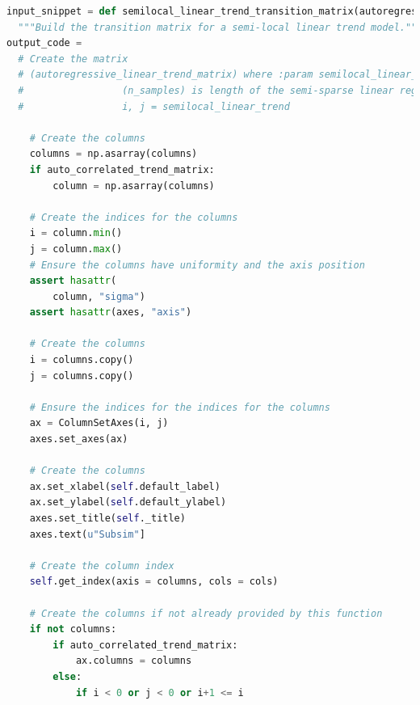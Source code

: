 \documentclass[10pt,twocolumn]{article}
\begin{document}
\begin{lstlisting}[language=Python,caption=Sample generated using small (117M) GPT-2 model after 40000 iterations.]
input_snippet = def semilocal_linear_trend_transition_matrix(autoregressive_coef):
  """Build the transition matrix for a semi-local linear trend model.""",
output_code = 
  # Create the matrix
  # (autoregressive_linear_trend_matrix) where :param semilocal_linear_trend_matrix:
  #                 (n_samples) is length of the semi-sparse linear regression matrix;
  #                 i, j = semilocal_linear_trend

    # Create the columns
    columns = np.asarray(columns)
    if auto_correlated_trend_matrix:
        column = np.asarray(columns)

    # Create the indices for the columns
    i = column.min()
    j = column.max()
    # Ensure the columns have uniformity and the axis position
    assert hasattr(
        column, "sigma")
    assert hasattr(axes, "axis")

    # Create the columns
    i = columns.copy()
    j = columns.copy()

    # Ensure the indices for the indices for the columns
    ax = ColumnSetAxes(i, j)
    axes.set_axes(ax)

    # Create the columns
    ax.set_xlabel(self.default_label)
    ax.set_ylabel(self.default_ylabel)
    axes.set_title(self._title)
    axes.text(u"Subsim"]

    # Create the column index
    self.get_index(axis = columns, cols = cols)

    # Create the columns if not already provided by this function
    if not columns:
        if auto_correlated_trend_matrix:
            ax.columns = columns
        else:
            if i < 0 or j < 0 or i+1 <= i
\end{lstlisting}
\end{document}
